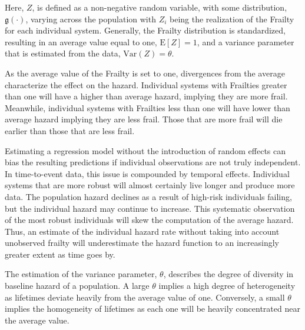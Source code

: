 
Here, $Z$, is defined as a non-negative random variable, with some distribution, $\mathfrak{g}(\cdot)$, varying across the population\cite{Wienke2010} with $Z_i$ being the realization of the Frailty for each individual system. Generally, the Frailty distribution is standardized, resulting in an average value equal to one, $\mathrm{E}[Z] = 1$, and a variance parameter that is estimated from the data, $\text{Var}(Z) = \theta$.



As the average value of the Frailty is set to one, divergences from the average characterize the effect on the hazard. Individual systems with Frailties greater than one will have a higher than average hazard, implying they are more frail. Meanwhile, individual systems with Frailties less than one will have lower than average hazard implying they are less frail. Those that are more frail will die earlier than those that are less frail.

Estimating a regression model without the introduction of random effects can bias the resulting predictions if individual observations are not truly independent. In time-to-event data, this issue is compounded by temporal effects. Individual systems that are more robust will almost certainly live longer and produce more data. The population hazard declines as a result of high-risk individuals failing, but the individual hazard may continue to increase. This systematic observation of the most robust individuals will skew the computation of the average hazard. Thus, an estimate of the individual hazard rate without taking into account unobserved frailty will underestimate the hazard function to an increasingly greater extent as time goes by\cite{Aalen2008}.

The estimation of the variance parameter, $\theta$, describes the degree of diversity in baseline hazard of a population. A large $\theta$ implies a high degree of heterogeneity as lifetimes deviate heavily from the average value of one. Conversely, a small $\theta$ implies the homogeneity of lifetimes as each one will be heavily concentrated near the average value.



